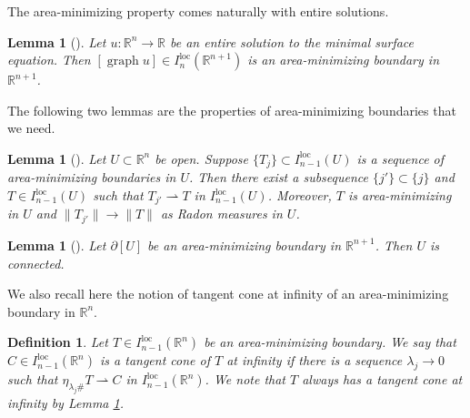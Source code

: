 \documentclass[pdflatex,sn-mathphys-num]{sn-jnl}%
\theoremstyle{thmstyleone}%
\newtheorem{lemma}[theorem]{Lemma}
\theoremstyle{thmstyletwo}%
\theoremstyle{thmstylethree}%
\newtheorem{definition}{Definition}%
\newcommand{\R}{\mathbb{R}}
\newcommand{\loc}{\mathrm{loc}}
\DeclareMathOperator{\graph}{graph}
\begin{document}
The area-minimizing property comes naturally with entire solutions.
\begin{lemma}[{\cite[\S 3]{simon1983survey}}]\label{minimizing}
	Let $u:\R^n\to\R$ be an entire solution to the minimal surface equation. Then $[\graph u]\in I_n^\loc(\R^{n+1})$ is an area-minimizing boundary in $\R^{n+1}$.
\end{lemma}

The following two lemmas are the properties of area-minimizing boundaries that we need.
\begin{lemma}[{\cite[Theorem 37.2]{Sim}}]\label{FedFlem}
	Let $U\subset \R^n$ be open. Suppose $\{T_j\}\subset I_{n-1}^\loc(U)$ is a sequence of area-minimizing boundaries in $U$. Then there exist a subsequence $\{j'\}\subset \{j\}$ and $T\in I_{n-1}^\loc(U)$ such that $T_{j'}\rightharpoonup T$ in $I_{n-1}^\loc(U)$. Moreover, $T$ is area-minimizing in $U$ and $\|T_{j'}\|\to \|T\|$ as Radon measures in $U$.
\end{lemma}


\begin{lemma}[{\cite[Theorem 1]{bombieri1972harnack}}]\label{indecomposable}
	Let $\partial [U]$ be an area-minimizing boundary in $\R^{n+1}$. Then $U$ is connected.
\end{lemma}


We also recall here the notion of tangent cone at infinity of an area-minimizing boundary in $\R^n$.
\begin{definition}
	Let $T\in I_{n-1}^\loc(\R^n)$ be an area-minimizing boundary. We say that $C\in I_{n-1}^\loc(\R^n)$ is a \textit{tangent cone of $T$ at infinity} if there is a sequence $\lambda_j\to0$ such that $\eta_{\lambda_{j}\#}T\rightharpoonup C$ in $I_{n-1}^\loc(\R^n)$. We note that $T$ always has a tangent cone at infinity by Lemma \ref{FedFlem}.
\end{definition}
\end{document}
